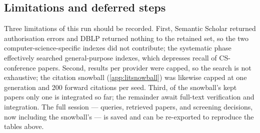 \subsection{Limitations and deferred steps}
\label{app:litlimitations}

Three limitations of this run should be recorded. First, Semantic Scholar
returned authorisation errors and DBLP returned nothing to the retained set, so
the two computer-science-specific indexes did not contribute; the systematic
phase effectively searched general-purpose indexes, which depresses recall of
CS-conference papers. Second, results per provider were capped, so the search is
not exhaustive; the citation snowball (\cref{app:litsnowball}) was likewise
capped at one generation and 200 forward citations per seed. Third, of the
snowball's kept papers only one is integrated so far; the remainder await
full-text verification and integration. The full session --- queries, retrieved
papers, and screening decisions, now including the snowball's --- is saved and
can be re-exported to reproduce the tables above.
